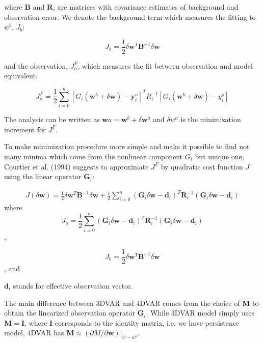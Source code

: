 \documentclass[a4,12pt]{article}
\begin{document}
where $\mathbf {B}$ and $\mathbf {R}_{i}$ are matrices with covariance estimates of background and observation error. We denote the background term which measures the fitting to $w^{b}$, $J_{b}$:

$$J_{b}=\frac{1}{2} \delta \mathbf {w}^{T} \mathbf {B}^{-1} \delta \mathbf {w}$$ 

and  the observation, $J_{o}^{F}$, which measures the fit between observation and model equivalent. 

$$J_{o}^{F}=\frac{1}{2} \sum_{i=0}^{n}[G_{i}(\mathbf {w}^{b}+\delta \mathbf {w})-\mathbf {y}_{i}^{o}]^{T}R_{i}^{-1}[G_{i}(\mathbf {w}^{b} + \delta \mathbf {w}) - y_{i}^{o}]$$

The analysis can be written as $\mathbf {w}{a} = \mathbf {w}^{b}+\delta \mathbf {w}^{a}$ and $\delta w^{a}$ is the minimization increment for $J^{F}$.

To make minimization procedure more simple and make it possible to find not many minima which come from the nonlinear component $G_{i}$ but unique one, Courtier et al. (1994) suggests to approximate $J^{F}$ by quadratic cost function $J$ using the linear operator $\mathbf {G}_{i}$:

\begin{align}
J(\delta \mathbf {w}) = \frac{1}{2} \delta \mathbf {w}^{T} \mathbf {B}^{-1} \delta \mathbf {w} + \frac{1}{2} \sum_{i=0}^{n}(\mathbf {G}_{i} \delta \mathbf {w} - \mathbf {d}_{i})^{T}\mathbf {R}_{i}^{-1}(\mathbf {G}_{i} \delta \mathbf {w} - \mathbf {d}_{i})
\end{align}
where $$J_{o} = \frac{1}{2} \sum_{i=0}^{n}(\mathbf {G}_{i} \delta \mathbf {w} - \mathbf {d}_{i})^{T}\mathbf {R}_{i}^{-1}(\mathbf {G}_{i} \delta \mathbf {w} - \mathbf {d}_{i})$$,

$$J_{b} = \frac{1}{2} \delta \mathbf {w}^{T} \mathbf {B}^{-1} \delta \mathbf {w}$$, and 

$\mathbf {d}_{i}$ stands for effective observation vector.

The main difference between 3DVAR and 4DVAR comes from the choice of $\mathbf{M}$ to obtain the linearized observation operator $\mathbf {G}_{i}$. While 3DVAR model simply uses $\mathbf {M} = \mathbf {I}$, where $\mathbf {I}$ corresponds to the identity matrix, i.e. we have persistence model, 4DVAR has $\mathbf {M} \approx (\partial M/\partial \mathbf {w})|_{w-w^{b}}$.
\end{document}
